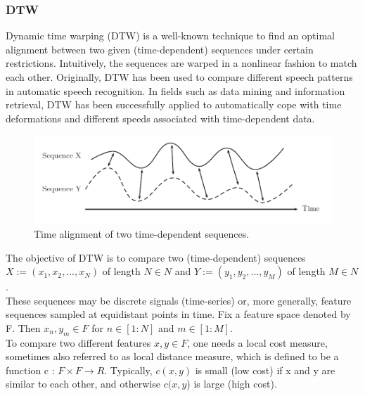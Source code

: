 \documentclass[12pt,a4paper]{report}
\begin{document}
\subsubsection{DTW}
Dynamic time warping (DTW) is a well-known technique to find an optimal
alignment between two given (time-dependent) sequences under certain restrictions. Intuitively, the sequences are warped in a nonlinear fashion
to match each other. Originally, DTW has been used to compare different
speech patterns in automatic speech recognition. In fields such as
data mining and information retrieval, DTW has been successfully applied
to automatically cope with time deformations and different speeds associated
with time-dependent data.
\begin{figure}[h!]
	\centering
		\includegraphics[scale=0.7]{screenshots/dtw/time_alignment.png}
		\caption{Time alignment of two time-dependent sequences.}
\end{figure}
The objective of DTW is to compare two (time-dependent) sequences 
$X := (x_1, x_2, . . . , x_N) $ of length $N \in N$ and $Y := (y_1, y_2, . . . , y_M)$ of length $M  \in N$.\\
These sequences may be discrete signals (time-series) or, more generally, feature
sequences sampled at equidistant points in time. Fix a
feature space denoted by F. Then $x_n, y_m  \in F$ for $n  \in [1 : N]$ and  $m  \in [1 : M].$\\
To compare two different features $x, y  \in F$, one needs a local cost measure,
sometimes also referred to as local distance measure, which is defined to be a
function
c : $F  \times F  \rightarrow R. $
Typically, $c(x, y)$ is small (low cost) if x and y are similar to each other, and
otherwise $c(x, y$) is large (high cost).\\
\end{document}
